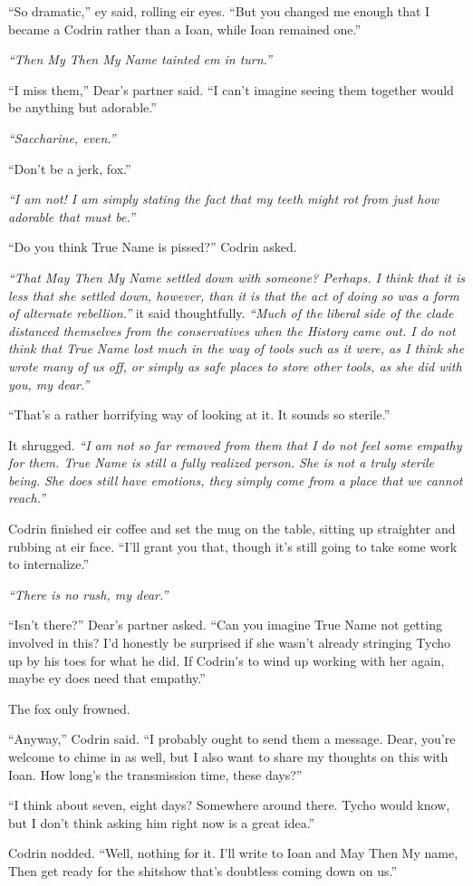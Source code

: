 ``So dramatic,'' ey said, rolling eir eyes. ``But you changed me enough that I became a Codrin rather than a Ioan, while Ioan remained one.''

\emph{``Then My Then My Name tainted em in turn.''}

``I miss them,'' Dear's partner said. ``I can't imagine seeing them together would be anything but adorable.''

\emph{``Saccharine, even.''}

``Don't be a jerk, fox.''

\emph{``I am not! I am simply stating the fact that my teeth might rot from just how adorable that must be.''}

``Do you think True Name is pissed?'' Codrin asked.

\emph{``That May Then My Name settled down with someone? Perhaps. I think that it is less that she settled down, however, than it is that the act of doing so was a form of alternate rebellion.''} it said thoughtfully. \emph{``Much of the liberal side of the clade distanced themselves from the conservatives when the History came out. I do not think that True Name lost much in the way of tools such as it were, as I think she wrote many of us off, or simply as safe places to store other tools, as she did with you, my dear.''}

``That's a rather horrifying way of looking at it. It sounds so sterile.''

It shrugged. \emph{``I am not so far removed from them that I do not feel some empathy for them. True Name is still a fully realized person. She is not a truly sterile being. She does still have emotions, they simply come from a place that we cannot reach.''}

Codrin finished eir coffee and set the mug on the table, sitting up straighter and rubbing at eir face. ``I'll grant you that, though it's still going to take some work to internalize.''

\emph{``There is no rush, my dear.''}

``Isn't there?'' Dear's partner asked. ``Can you imagine True Name not getting involved in this? I'd honestly be surprised if she wasn't already stringing Tycho up by his toes for what he did. If Codrin's to wind up working with her again, maybe ey does need that empathy.''

The fox only frowned.

``Anyway,'' Codrin said. ``I probably ought to send them a message. Dear, you're welcome to chime in as well, but I also want to share my thoughts on this with Ioan. How long's the transmission time, these days?''

``I think about seven, eight days? Somewhere around there. Tycho would know, but I don't think asking him right now is a great idea.''

Codrin nodded. ``Well, nothing for it. I'll write to Ioan and May Then My name, Then get ready for the shitshow that's doubtless coming down on us.''
